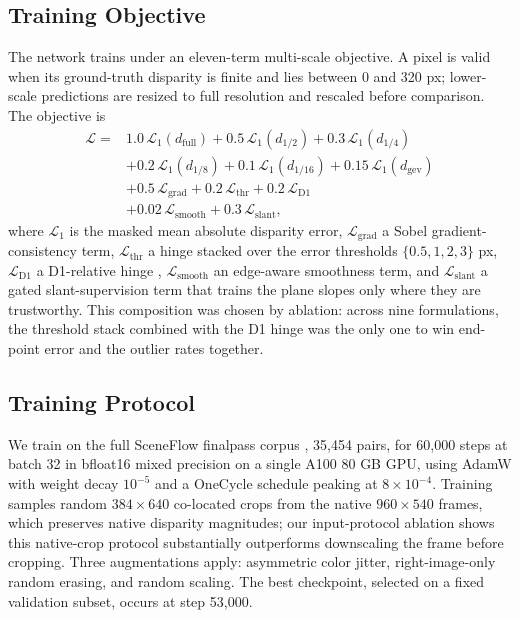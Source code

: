 \documentclass[conference]{IEEEtran}
\begin{document}
\subsection{Training Objective}
The network trains under an eleven-term multi-scale objective. A pixel is valid when its ground-truth disparity is finite and lies between 0 and 320 px; lower-scale predictions are resized to full resolution and rescaled before comparison. The objective is
\begin{equation}
\begin{aligned}
\mathcal{L} ={}& 1.0\,\mathcal{L}_{1}(d_{\mathrm{full}})
 + 0.5\,\mathcal{L}_{1}(d_{1/2})
 + 0.3\,\mathcal{L}_{1}(d_{1/4})\\
&+ 0.2\,\mathcal{L}_{1}(d_{1/8})
 + 0.1\,\mathcal{L}_{1}(d_{1/16})
 + 0.15\,\mathcal{L}_{1}(d_{\mathrm{gev}})\\
&+ 0.5\,\mathcal{L}_{\mathrm{grad}}
 + 0.2\,\mathcal{L}_{\mathrm{thr}}
 + 0.2\,\mathcal{L}_{\mathrm{D1}}\\
&+ 0.02\,\mathcal{L}_{\mathrm{smooth}}
 + 0.3\,\mathcal{L}_{\mathrm{slant}},
\end{aligned}
\label{eq:loss}
\end{equation}
where $\mathcal{L}_1$ is the masked mean absolute disparity error, $\mathcal{L}_{\mathrm{grad}}$ a Sobel gradient-consistency term, $\mathcal{L}_{\mathrm{thr}}$ a hinge stacked over the error thresholds $\{0.5, 1, 2, 3\}$ px, $\mathcal{L}_{\mathrm{D1}}$ a D1-relative hinge \cite{menze2015kitti}, $\mathcal{L}_{\mathrm{smooth}}$ an edge-aware smoothness term, and $\mathcal{L}_{\mathrm{slant}}$ a gated slant-supervision term that trains the plane slopes only where they are trustworthy. This composition was chosen by ablation: across nine formulations, the threshold stack combined with the D1 hinge was the only one to win end-point error and the outlier rates together.

\subsection{Training Protocol}
We train on the full SceneFlow finalpass corpus \cite{mayer2016sceneflow}, 35{,}454 pairs, for 60{,}000 steps at batch 32 in bfloat16 mixed precision on a single A100 80 GB GPU, using AdamW with weight decay $10^{-5}$ and a OneCycle schedule peaking at $8\times 10^{-4}$. Training samples random $384\times 640$ co-located crops from the native $960\times 540$ frames, which preserves native disparity magnitudes; our input-protocol ablation shows this native-crop protocol substantially outperforms downscaling the frame before cropping. Three augmentations apply: asymmetric color jitter, right-image-only random erasing, and random scaling. The best checkpoint, selected on a fixed validation subset, occurs at step 53{,}000.
\end{document}
